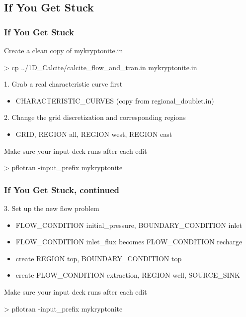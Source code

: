 \documentclass{beamer}
\begin{document}
\subsection{If You Get Stuck}

\begin{frame}[fragile]\frametitle{If You Get Stuck}
Create a clean copy of mykryptonite.in
\begin{semiverbatim}
  > cp ../1D\_Calcite/calcite\_flow\_and\_tran.in mykryptonite.in
\end{semiverbatim}
1. Grab a real characteristic curve first
\begin{itemize}\small
  \item{CHARACTERISTIC\_CURVES (copy from regional\_doublet.in)}
\end{itemize}
2. Change the grid discretization and corresponding regions
\begin{itemize}\small
  \item{GRID, REGION all, REGION west, REGION east}
\end{itemize}
Make sure your input deck runs after each edit
\begin{semiverbatim}
  > pflotran -input\_prefix mykryptonite
\end{semiverbatim}
\end{frame}

\begin{frame}[fragile]\frametitle{If You Get Stuck, continued}
3. Set up the new flow problem
\begin{itemize}\small
  \item{FLOW\_CONDITION initial\_pressure, BOUNDARY\_CONDITION inlet}
  \item{FLOW\_CONDITION inlet\_flux becomes FLOW\_CONDITION recharge}
  \item{create REGION top, BOUNDARY\_CONDITION top}
  \item{create FLOW\_CONDITION extraction, REGION well, SOURCE\_SINK}
\end{itemize}
Make sure your input deck runs after each edit
\begin{semiverbatim}
  > pflotran -input\_prefix mykryptonite
\end{semiverbatim}
\end{frame}
\end{document}
